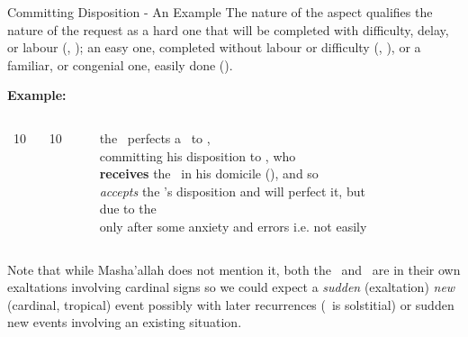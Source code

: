 \begin{frame}[t]{Committing Disposition - An Example}
The nature of the aspect qualifies the nature of the request as a hard one that will be completed with difficulty, delay, or labour (\Square, \Opposition); an easy one, completed without labour or difficulty (\Sextile, \Trine), or a familiar, or congenial one, easily done (\Conjunction).

\textbf{Example:}
\begin{columns}[T, onlytextwidth]
\Sun\ 10 \Aries\ \Square\ \Mars\ 10 \Capricorn

\rule{.1mm}{.30\textheight}

the \Sun\ perfects a \Square\  to \Mars, \\
committing his disposition to \Mars, who  \\
\textbf{receives} the \Sun\ in his domicile (\Aries), and so \\
\textsl{accepts} the \Sun's disposition and will perfect it, but \\
due to the \Square\, \\ 
only after some anxiety and errors i.e. not easily
\end{columns}
\vspace{0.5cm}
Note that while Masha'allah does not mention it, both the \Sun\ and \Mars\ are in their own exaltations involving cardinal signs so we could expect a \textsl{sudden} (exaltation) \textsl{new} (cardinal, tropical) event possibly with later recurrences (\Capricorn\ is solstitial) or sudden new events involving an existing situation.
\end{frame}
